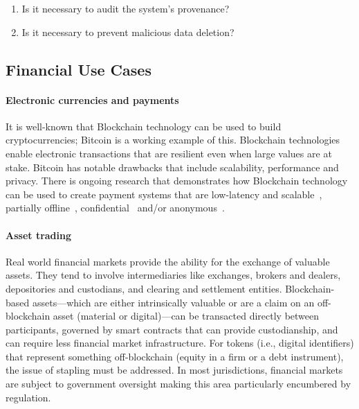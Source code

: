 \begin{enumerate}[start=3]
	\item Is it necessary to audit the system's provenance?
	\item Is it necessary to prevent malicious data deletion?
\end{enumerate}




\subsection{Financial Use Cases}

\paragraph{Electronic currencies and payments}


It is well-known that Blockchain technology can be used to build cryptocurrencies; Bitcoin is a working example of this.
Blockchain technologies enable electronic transactions that are resilient even when large values are at stake.
Bitcoin has notable drawbacks that include scalability, performance and privacy.
There is ongoing research that demonstrates how Blockchain technology can be used to create payment systems that are low-latency and scalable~\cite{}, partially offline~\cite{}, confidential~\cite{} and/or anonymous~\cite{}.

\paragraph{Asset trading}

Real world financial markets provide the ability for the exchange of valuable assets. 
They tend to involve intermediaries like exchanges, brokers and dealers, depositories and custodians, and clearing and settlement entities. 
Blockchain-based assets---which are either intrinsically valuable or are a claim on an off-blockchain asset (material or digital)---can be transacted directly between participants, governed by smart contracts that can provide custodianship, and can require less financial market infrastructure.
For tokens (i.e., digital identifiers) that represent something off-blockchain (\ie equity in a firm or a debt instrument), the issue of stapling must be addressed.
In most jurisdictions, financial markets are subject to government oversight making this area particularly encumbered by regulation.

